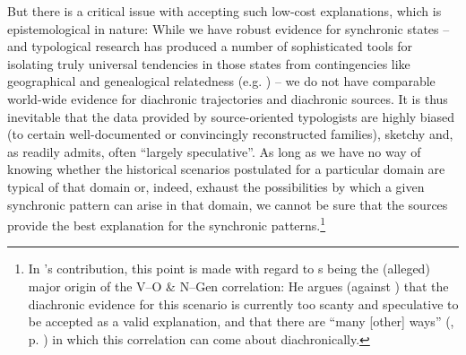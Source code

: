 \documentclass[output=paper]{langsci/langscibook}
\begin{document}
But there is a critical issue with accepting such low-cost explanations, which is epistemological in nature: While we have robust evidence for synchronic states – and typological research has produced a number of sophisticated tools for isolating truly universal tendencies in those states from contingencies like geographical and genealogical relatedness (e.g. \citealt{Bickel2013,Bickel2018,JaegerEtAl2011}) – we do not have comparable world-wide evidence for diachronic trajectories and diachronic sources. It is thus inevitable that the data provided by source-oriented typologists are highly biased (to certain well-documented or convincingly reconstructed families), sketchy and, as \citet[3]{Creissels2008} readily admits, often “largely speculative”. As long as we have no way of knowing whether the historical scenarios postulated for a particular domain are typical of that domain or, indeed, exhaust the possibilities by which a given synchronic pattern can arise in that domain, we cannot be sure that the sources provide the best explanation for the synchronic patterns.\footnote{In ’s contribution, this point is made with regard to s being the (alleged) major origin of the V–O \& N–Gen correlation: He argues (against ) that the diachronic evidence for this scenario is currently too scanty and speculative to be accepted as a valid explanation, and that there are “many [other] ways” (, p. \pageref{p:dryer:manyotherways}) in which this correlation can come about diachronically.} 
\newpage
\end{document}
